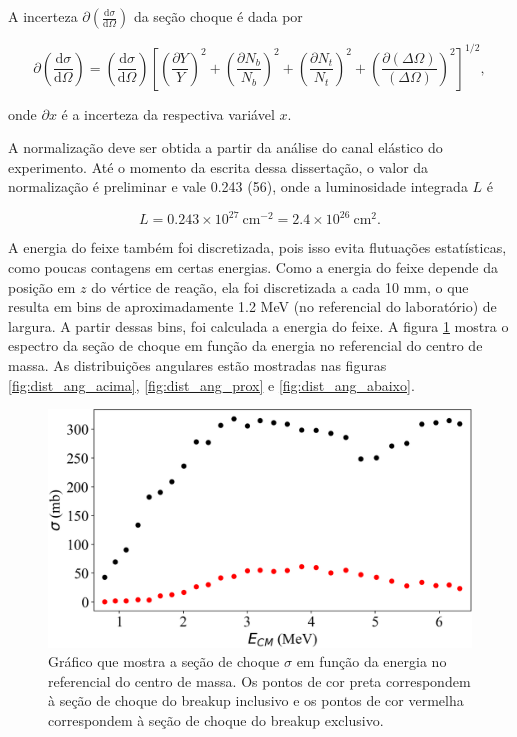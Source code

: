 \documentclass[a4paper,12pt,oneside]{book}
\begin{document}

\par A incerteza $\partial \left(\frac{\mathrm{d}\sigma}{\mathrm{d}\Omega}\right)$ da seção choque é dada por

\begin{equation}
	\partial\left(\frac{\mathrm{d} \sigma}{\mathrm{d} \Omega}\right)=\left(\frac{\mathrm{d} \sigma}{\mathrm{d} \Omega}\right)\left[\left(\frac{\partial Y}{Y}\right)^{2}+\left(\frac{\partial N_{b}}{N_{b}}\right)^{2}+\left(\frac{\partial N_{t}}{N_{t}}\right)^{2}+\left(\frac{\partial(\Delta \Omega)}{(\Delta \Omega)}\right)^{2}\right]^{1 / 2},
\end{equation}

\par onde $\partial x$ é a incerteza da respectiva variável $x$.

\par A normalização deve ser obtida a partir da análise do canal elástico do experimento. Até o momento da escrita dessa dissertação, o valor da normalização é preliminar e vale 0.243 (56), onde a luminosidade integrada $L$ é

\begin{equation}
	L = 0.243\times 10^{27} \: \mathrm{cm}^{-2} =  2.4\times 10^{26}\: \mathrm{cm}^{2}.
\end{equation}

\par A energia do feixe também foi discretizada, pois isso evita flutuações estatísticas, como poucas contagens em certas energias. Como a energia do feixe depende da posição em $z$ do vértice de reação, ela foi discretizada a cada 10 mm, o que resulta em bins de aproximadamente 1.2 MeV (no referencial do laboratório) de largura. A partir dessas bins, foi calculada a energia do feixe. A figura \ref{fig:contagem_energia} mostra o espectro da seção de choque em função da energia no referencial do centro de massa. As distribuições angulares estão mostradas nas figuras \ref{fig:dist_ang_acima}, \ref{fig:dist_ang_prox} e \ref{fig:dist_ang_abaixo}.

\begin{figure}[H]
\centering
    \includegraphics[scale = 1., width=0.7\columnwidth]{figs/contagens_energia.png}
    \caption{Gráfico que mostra a seção de choque $\sigma$ em função da energia no referencial do centro de massa. Os pontos de cor preta correspondem à seção de choque do breakup inclusivo e os pontos de cor vermelha correspondem à seção de choque do breakup exclusivo.}
    \label{fig:contagem_energia}
\end{figure}
\end{document}
